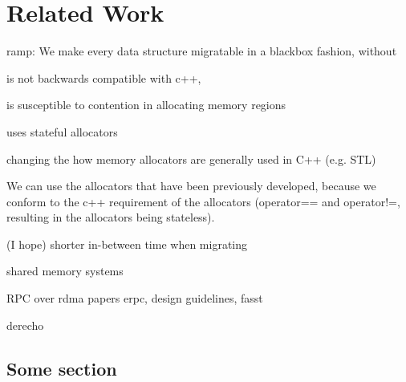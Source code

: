 \chapter{Related Work}
\label{chap:related}

ramp: We make every data structure migratable in a blackbox fashion, without

is not backwards compatible with c++,

is susceptible to contention in allocating memory regions

uses stateful allocators

changing the how memory allocators are generally used in C++ (e.g. STL)

We can use the allocators that have been previously developed, because we
conform to the c++ requirement of the allocators (operator== and operator!=,
resulting in the allocators being stateless).

(I hope) shorter in-between time when migrating




shared memory systems


RPC over rdma papers erpc, design guidelines, fasst 


derecho


\section{Some section}
